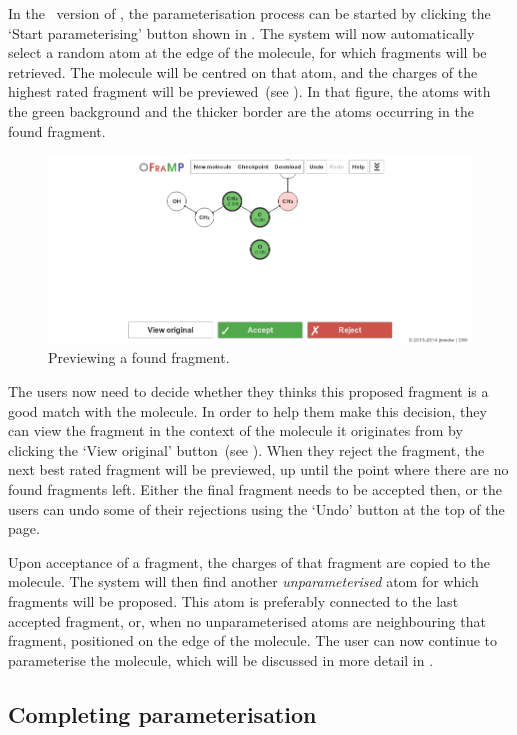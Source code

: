 In the \IDb\ version of \oframp, the parameterisation process can be started by clicking the `Start parameterising' button shown in . The system will now automatically select a random atom at the edge of the molecule, for which fragments will be retrieved. The molecule will be centred on that atom, and the charges of the highest rated fragment will be previewed~(see ). In that figure, the atoms with the green background and the thicker border are the atoms occurring in the found fragment.

\begin{figure}
\center
\includegraphics[width=.9\textwidth]{img/find_4.png}
\caption{Previewing a found fragment.}
\end{figure}

The users now need to decide whether they thinks this proposed fragment is a good match with the molecule. In order to help them make this decision, they can view the fragment in the context of the molecule it originates from by clicking the `View original' button~(see ). When they reject the fragment, the next best rated fragment will be previewed, up until the point where there are no found fragments left. Either the final fragment needs to be accepted then, or the users can undo some of their rejections using the `Undo' button at the top of the page.

Upon acceptance of a fragment, the charges of that fragment are copied to the molecule. The system will then find another \emph{unparameterised} atom for which fragments will be proposed. This atom is preferably connected to the last accepted fragment, or, when no unparameterised atoms are neighbouring that fragment, positioned on the edge of the molecule. The user can now continue to parameterise the molecule, which will be discussed in more detail in .


\subsection{Completing parameterisation}

